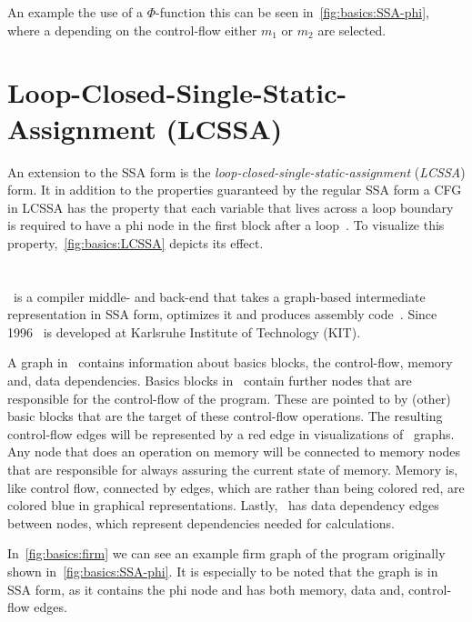 An example the use of a $\Phi$-function this can be seen in~\cref{fig:basics:SSA-phi}, where a depending on the control-flow either $m_1$ or $m_2$ are selected.




\section{Loop-Closed-Single-Static-Assignment (LCSSA)}\label{sec:basics:LCSSA}

An extension to the SSA form is the \textit{loop-closed-single-static-assignment} (\textit{LCSSA}) form.
It in addition to the properties guaranteed by the regular SSA form a CFG in LCSSA has the property that each variable that lives across a loop boundary is required to have a phi node in the first block after a loop~\cite{LLVM_LCSSA}.
To visualize this property,~\cref{fig:basics:LCSSA} depicts its effect.



\section{\libFIRM}\label{sec:basics:firm}

\libFIRM~is a compiler middle- and back-end that takes a graph-based intermediate representation in SSA form, optimizes it and produces assembly code~\cite{libfirm}.
Since 1996 \libFIRM~is developed at Karlsruhe Institute of Technology (KIT).

A graph in \libFIRM~contains information about basics blocks, the control-flow, memory and, data dependencies.
Basics blocks in \libFIRM~contain further nodes that are responsible for the control-flow of the program.
These are pointed to by (other) basic blocks that are the target of these control-flow operations.
The resulting control-flow edges will be represented by a red edge in visualizations of \libFIRM~graphs.
Any node that does an operation on memory will be connected to memory nodes that are responsible for always assuring the current state of memory.
Memory is, like control flow, connected by edges, which are rather than being colored red, are colored blue in graphical representations.
Lastly, \libFIRM~has data dependency edges between nodes, which represent dependencies needed for calculations.

In~\cref{fig:basics:firm} we can see an example firm graph of the program originally shown in~\cref{fig:basics:SSA-phi}.
It is especially to be noted that the graph is in SSA form, as it contains the phi node and has both memory, data and, control-flow edges.

